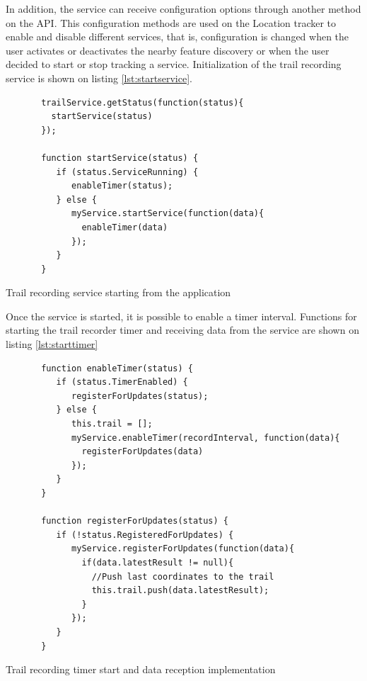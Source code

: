 In addition, the service can receive configuration options through another method on the API. This configuration methods are used on the Location tracker to enable and disable different services, that is, configuration is changed when the user activates or deactivates the nearby feature discovery or when the user decided to start or stop tracking a service. Initialization of the trail recording service is shown on listing \ref{lst:startservice}.

\begin{listing}[ht]\centering
  \begin{minipage}{.8\textwidth}
    \begin{verbatim}
       trailService.getStatus(function(status){
         startService(status)
       });
       
       function startService(status) {
          if (status.ServiceRunning) {
             enableTimer(status);
          } else {
             myService.startService(function(data){
               enableTimer(data)
             });
          }
       }
    \end{verbatim}
  \end{minipage}
  \caption{Trail recording service starting from the application}\label{lst:startservice}
\end{listing}

Once the service is started, it is possible to enable a timer interval. Functions for starting the trail recorder timer and receiving data from the service are shown on listing \ref{lst:starttimer}

\begin{listing}[ht]\centering
  \begin{minipage}{.8\textwidth}
    \begin{verbatim}
       function enableTimer(status) {
          if (status.TimerEnabled) {
             registerForUpdates(status);
          } else {
             this.trail = [];
             myService.enableTimer(recordInterval, function(data){
               registerForUpdates(data)
             });
          }
       }
       
       function registerForUpdates(status) {
          if (!status.RegisteredForUpdates) {
             myService.registerForUpdates(function(data){
               if(data.latestResult != null){
                 //Push last coordinates to the trail
                 this.trail.push(data.latestResult);
               }
             });
          }
       }
    \end{verbatim}
  \end{minipage}
  \caption{Trail recording timer start and data reception implementation}\label{lst:starttimer}
\end{listing}

